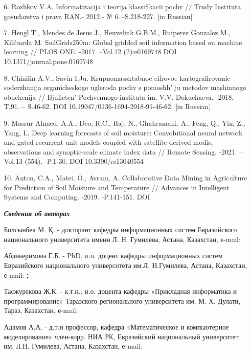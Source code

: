 6. Rozhkov V.A. Informatizacija i teorija klassifikacii pochv // Trudy
Instituta gosudarstva i prava RAN.- 2012.- № 6. -S.218-227. {[}in
Russian{]}

7. Hengl T., Mendes de Jesus J., Heuvelink G.B.M., Ruiperez Gonzalez M.,
Kilibarda M. SoilGrids250m: Global gridded soil information based on
machine learning // PLOS ONE. -2017. --Vol.12 (2):e0169748 DOI
10.1371/journal.pone.0169748

8. Chinilin A.V., Savin I.Ju. Krupnomasshtabnoe cifrovoe
kartografirovanie soderzhanija organicheskogo ugleroda pochv s
pomoshh' ju metodov mashinnogo obuchenija //
Bjulleten'{} Pochvennogo instituta im. V.V. Dokuchaeva.
-2018. --T.91. -- S.46-62. DOI 10.19047/0136-1694-2018-91-46-62. {[}in
Russian{]}

9. Masrur Ahmed, A.A., Deo, R.C., Raj, N., Ghahramani, A., Feng, Q., Yin,
Z., Yang, L. Deep learning forecasts of soil moisture: Convolutional
neural network and gated recurrent unit models coupled with
satellite-derived modis, observations and synoptic-scale climate index
data // Remote Sensing. -2021. --Vol.13 (554). -P.1-30. DOI
10.3390/rs13040554

10. Anton, C.A., Matei, O., Avram, A. Collaborative Data Mining in
Agriculture for Prediction of Soil Moisture and Temperature // Advances
in Intelligent Systems and Computing. -2019. -P.141-151. DOI


\emph{{\bfseries Сведения об авторах}}

Болсынбек М. Қ. - докторант кафедры информационных систем Евразийского
национального университета имени Л. Н. Гумилева, Астана, Казахстан,
е-mail:

\href{https://orcid.org/0009-0001-0233-1984}{}

Абдикеримова Г.Б. - PhD, и.о. доцент кафедры информационных систем
Евразийского национального университета им.Л. Н.Гумилева, Астана,
Казахстан, е-mail:
\href{mailto:gulzira1981@mail.ru}{}{\bfseries ;
\href{https://orcid.org/0000-0002-4953-0737}{}}

Тасжурекова Ж.К. - к.т.н., и.о. доцента кафедры «Прикладная
информатика и программирование» Таразского регионального университета
им. М. Х. Дулати, Тараз, Казахстан, е-mail:


Адамов А.А. - д.т.н профессор, кафедра «Математическое и
компьютерное моделирование» член-корр. НИА РК, Евразийский национальный
университет им. Л.Н. Гумилева, Астана, Казахстан, е-mail:

\href{https://orcid.org/0000-0001-9515-1263}{}

